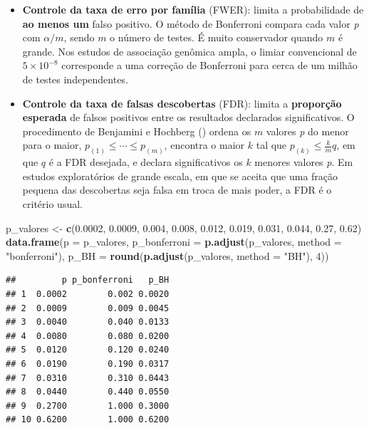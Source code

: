 \documentclass[
]{book}
\newenvironment{Shaded}{\begin{snugshade}}{\end{snugshade}}
\newcommand{\AttributeTok}[1]{\textcolor[rgb]{0.13,0.29,0.53}{#1}}
\newcommand{\DecValTok}[1]{\textcolor[rgb]{0.00,0.00,0.81}{#1}}
\newcommand{\FloatTok}[1]{\textcolor[rgb]{0.00,0.00,0.81}{#1}}
\newcommand{\FunctionTok}[1]{\textcolor[rgb]{0.13,0.29,0.53}{\textbf{#1}}}
\newcommand{\NormalTok}[1]{#1}
\newcommand{\OtherTok}[1]{\textcolor[rgb]{0.56,0.35,0.01}{#1}}
\newcommand{\StringTok}[1]{\textcolor[rgb]{0.31,0.60,0.02}{#1}}
\providecommand{\tightlist}{%
  \setlength{\itemsep}{0pt}\setlength{\parskip}{0pt}}
\begin{document}
\begin{itemize}
\tightlist
\item
  \textbf{Controle da taxa de erro por família} (FWER): limita a probabilidade de \textbf{ao menos um} falso positivo. O método de Bonferroni compara cada valor \emph{p} com \(\alpha/m\), sendo \(m\) o número de testes. É muito conservador quando \(m\) é grande. Nos estudos de associação genômica ampla, o limiar convencional de \(5 \times 10^{-8}\) corresponde a uma correção de Bonferroni para cerca de um milhão de testes independentes.
\item
  \textbf{Controle da taxa de falsas descobertas} (FDR): limita a \textbf{proporção esperada} de falsos positivos entre os resultados declarados significativos. O procedimento de Benjamini e Hochberg () ordena os \(m\) valores \emph{p} do menor para o maior, \(p_{(1)} \le \cdots \le p_{(m)}\), encontra o maior \(k\) tal que \(p_{(k)} \le \frac{k}{m}q\), em que \(q\) é a FDR desejada, e declara significativos os \(k\) menores valores \emph{p}. Em estudos exploratórios de grande escala, em que se aceita que uma fração pequena das descobertas seja falsa em troca de mais poder, a FDR é o critério usual.
\end{itemize}

\begin{Shaded}
\begin{Highlighting}[]
\NormalTok{p\_valores }\OtherTok{\textless{}{-}} \FunctionTok{c}\NormalTok{(}\FloatTok{0.0002}\NormalTok{, }\FloatTok{0.0009}\NormalTok{, }\FloatTok{0.004}\NormalTok{, }\FloatTok{0.008}\NormalTok{, }\FloatTok{0.012}\NormalTok{, }\FloatTok{0.019}\NormalTok{, }\FloatTok{0.031}\NormalTok{, }\FloatTok{0.044}\NormalTok{, }\FloatTok{0.27}\NormalTok{, }\FloatTok{0.62}\NormalTok{)}
\FunctionTok{data.frame}\NormalTok{(}\AttributeTok{p =}\NormalTok{ p\_valores,}
           \AttributeTok{p\_bonferroni =} \FunctionTok{p.adjust}\NormalTok{(p\_valores, }\AttributeTok{method =} \StringTok{"bonferroni"}\NormalTok{),}
           \AttributeTok{p\_BH =} \FunctionTok{round}\NormalTok{(}\FunctionTok{p.adjust}\NormalTok{(p\_valores, }\AttributeTok{method =} \StringTok{"BH"}\NormalTok{), }\DecValTok{4}\NormalTok{))}
\end{Highlighting}
\end{Shaded}

\begin{verbatim}
##         p p_bonferroni   p_BH
## 1  0.0002        0.002 0.0020
## 2  0.0009        0.009 0.0045
## 3  0.0040        0.040 0.0133
## 4  0.0080        0.080 0.0200
## 5  0.0120        0.120 0.0240
## 6  0.0190        0.190 0.0317
## 7  0.0310        0.310 0.0443
## 8  0.0440        0.440 0.0550
## 9  0.2700        1.000 0.3000
## 10 0.6200        1.000 0.6200
\end{verbatim}
\end{document}
